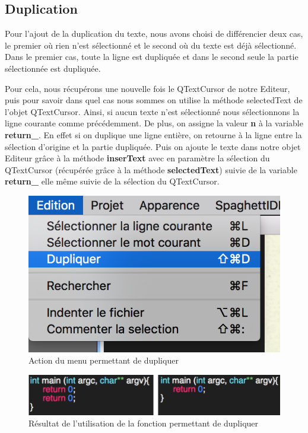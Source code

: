 \documentclass[a4paper,12pt]{article}
\begin{document}

	\subsection{Duplication}

	Pour l'ajout de la duplication du texte, nous avons choisi de différencier deux cas, le premier où rien n'est sélectionné et le second où du texte est déjà sélectionné. Dans le premier cas, toute la ligne est dupliquée et dans le second seule la partie sélectionnée est dupliquée.

	Pour cela, nous récupérons une nouvelle fois le QTextCursor de notre Editeur, puis pour savoir dans quel cas nous sommes on utilise la méthode selectedText de l'objet QTextCursor. Ainsi, si aucun texte n'est sélectionné nous sélectionnons la ligne courante comme précédemment. De plus, on assigne la valeur \textbf{n} à la variable \textbf{return\_}. En effet si on duplique une ligne entière, on retourne à la ligne entre la sélection d'origine et la partie dupliquée. Puis on ajoute le texte dans notre objet Editeur grâce à la méthode \textbf{inserText} avec en paramètre la sélection du QTextCursor (récupérée grâce à la méthode \textbf{selectedText}) suivie de la variable \textbf{return\_} elle même suivie de la sélection du QTextCursor.

	\begin{figure}[h!]
		\begin{center}
			\includegraphics[scale=0.8]{images/imgs_edit/utilisation_duplication}
			\caption{Action du menu permettant de dupliquer}
		\end{center}
	\end{figure}


	\begin{figure}[h!]
		\begin{center}
			\includegraphics[scale=0.8]{images/imgs_edit/resultat_duplication}
			\caption{Résultat de l'utilisation de la fonction permettant de dupliquer}
		\end{center}
	\end{figure}
\end{document}
